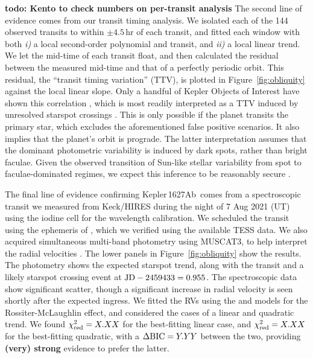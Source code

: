 \documentclass[12pt,modern,twocolumn,tighten]{aastex63}
\newcommand{\pn}{Kepler\,1627Ab} %
\begin{document}
{\bf todo: Kento to check numbers on per-transit analysis} 
The second line of evidence comes from our transit timing analysis. We
isolated each of the 144 observed transits to within $\pm4.5$\,hr of
each transit, and fitted each window with both {\it i)} a local
second-order polynomial and transit, and {\it ii)} a local linear
trend.  We let the mid-time of each transit float, and then calculated
the residual between the measured mid-time and that of a perfectly
periodic orbit.  This residual, the ``transit timing variation''
(TTV), is plotted in Figure~\ref{fig:obliquity} against the local
linear slope.  Only a handful of Kepler Objects of Interest have shown
this correlation \citep{holczer_time_2015}, which is most readily
interpreted as a TTV induced by unresolved starspot crossings
\citep{mazeh_time_2015}.  This is only possible if the
planet transits the primary star, which excludes the
aforementioned false positive scenarios.  It also implies that the
planet's orbit is prograde.  The latter interpretation assumes that
the dominant photometric variability is induced by dark spots, rather
than bright faculae.  Given the observed transition of Sun-like
stellar variability from spot to faculae-dominated regimes, we expect
this inference to be reasonably secure
\citep{shapiro_are_2016,montet_long-term_2017,reinhold_stellar_2020}.

The final line of evidence confirming \pn\ comes from a spectroscopic
transit we measured from Keck/HIRES during the night of 7 Aug 2021
(UT) using the iodine cell for the wavelength calibration.  We
scheduled the transit using the ephemeris of
\citet{holczer_transit_2016}, which we verified using the available
TESS data.  We also acquired simultaneous multi-band photometry using
MUSCAT3, to help interpret the radial velocities \citep{Narita_2020}.
The lower panels in Figure~\ref{fig:obliquity} show the results.  The
photometry shows the expected starspot trend, along with the transit
and a likely starspot crossing event at ${\rm JD} - 2459433 = 0.955$.
The spectroscopic data show significant scatter, though a significant
increase in radial velocity is seen shortly after the expected
ingress.  We fitted the RVs using the \citet{hirano_analytic_2010} and
\citet{hirano_2011} models for the Rossiter-McLaughlin effect, and
considered the cases of a linear and quadratic trend.
We found $\chi^2_{\rm red} = X.XX$ for the best-fitting linear case, 
and
$\chi^2_{\rm red} = X.XX$ for the best-fitting quadratic, with a
$\Delta {\rm BIC} = Y.YY$ between the two, providing {\bf (very)
strong} evidence to prefer the latter.
\end{document}
